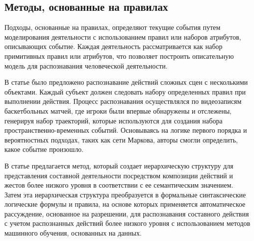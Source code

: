 \subsection{Методы, основанные на правилах}

Подходы, основанные на правилах, определяют текущие события путем моделирования деятельности с использованием правил или наборов атрибутов, описывающих событие. \newline Каждая деятельность рассматривается как набор примитивных правил или атрибутов, что позволяет построить описательную модель для распознавания человеческой деятельности.

В статье \cite{rule1}
было предложено распознавание действий сложных сцен с несколькими объектами. Каждый субъект должен следовать набору определенных правил при выполнении действия. Процесс
распознавания осуществлялся по видеозаписям баскетбольных матчей,
где игроки были впервые обнаружены и отслежены, генерируя
набор траекторий, которые используются для создания набора пространственно-временных событий. Основываясь на логике первого порядка и вероятностных подходах,
таких как сети Маркова, авторы смогли определить, какое
событие произошло. 





В статье \cite{rule2} предлагается метод, который создает иерархическую структуру для представления составной деятельности посредством композиции действий и жестов более низкого уровня в соответствии с ее семантическим значением. Затем эта иерархическая структура преобразуется в формальные синтаксические логические формулы и правила, на основе которых применяется автоматическое рассуждение, основанное на разрешении, для распознавания составного действия с учетом распознанных действий более низкого уровня с использованием методов машинного обучения, основанных на данных. 

